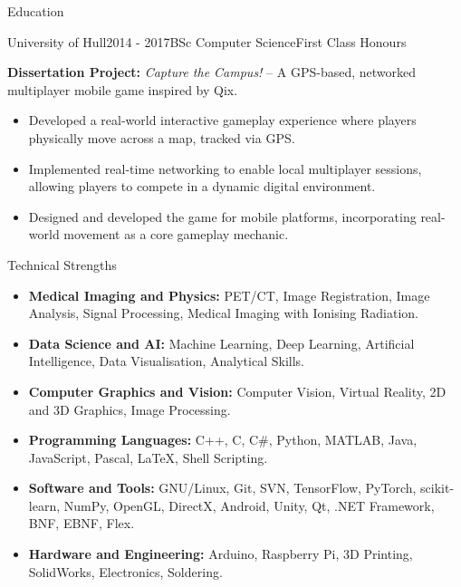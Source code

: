 \documentclass{cv}
\begin{document}
\begin{rSection}{Education}
        \item \begin{rSubsection}{University of Hull}{2014 - 2017}{BSc Computer Science}{First Class Honours}
            \item \textbf{Dissertation Project:} \textit{Capture the Campus!} – A GPS-based, networked multiplayer mobile game inspired by Qix.
            
            \item \begin{itemize}
                \item Developed a real-world interactive gameplay experience where players physically move across a map, tracked via GPS.
                \item Implemented real-time networking to enable local multiplayer sessions, allowing players to compete in a dynamic digital environment.
                \item Designed and developed the game for mobile platforms, incorporating real-world movement as a core gameplay mechanic.
            \end{itemize}
        \end{rSubsection}
    \end{rSection}

    \begin{rSection}{Technical Strengths}
        \item \begin{itemize}
            \item \textbf{Medical Imaging and Physics:} PET/CT, Image Registration, Image Analysis, Signal Processing, Medical Imaging with Ionising Radiation.
            \item \textbf{Data Science and AI:} Machine Learning, Deep Learning, Artificial Intelligence, Data Visualisation, Analytical Skills.
            \item \textbf{Computer Graphics and Vision:} Computer Vision, Virtual Reality, 2D and 3D Graphics, Image Processing.
            \item \textbf{Programming Languages:} C++, C, C\#, Python, MATLAB, Java, JavaScript, Pascal, LaTeX, Shell Scripting.
            \item \textbf{Software and Tools:} GNU/Linux, Git, SVN, TensorFlow, PyTorch, scikit-learn, NumPy, OpenGL, DirectX, Android, Unity, Qt, .NET Framework, BNF, EBNF, Flex.
            \item \textbf{Hardware and Engineering:} Arduino, Raspberry Pi, 3D Printing, SolidWorks, Electronics, Soldering.
        \end{itemize}
    \end{rSection}
    
\end{document}

